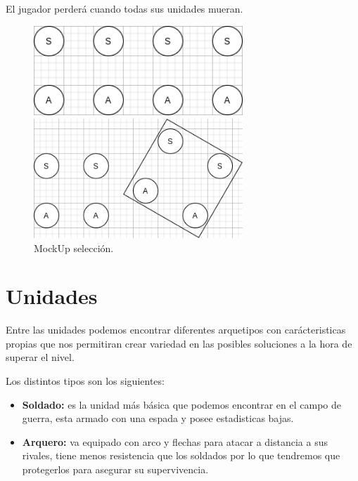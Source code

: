 El jugador perderá cuando todas sus unidades mueran.

\begin{figure}[ht]
\centering
\begin{minipage}[c]{0.45\linewidth}
	\hspace{1cm}
	\includegraphics[width=0.7\textwidth]{imagenes/gdd/non-selection.png}
\end{minipage}
\begin{minipage}[c]{0.45\linewidth}
	\includegraphics[width=0.7\textwidth]{imagenes/gdd/selection.png}
\end{minipage}	
\caption{MockUp selección.}
\label{fig:unit-selec}
\end{figure}

\section{Unidades}
Entre las unidades podemos encontrar diferentes arquetipos con carácteristicas propias
que nos permitiran crear variedad en las posibles soluciones a la hora de superar el
nivel.

Los distintos tipos son los siguientes:
\begin{itemize}
	\item \textbf{Soldado:} es la unidad más básica que podemos encontrar en el campo de
							guerra, esta armado con una espada y posee estadisticas
							bajas.
	\item \textbf{Arquero:} va equipado con arco y flechas para atacar a distancia a
							sus rivales, tiene menos resistencia que los soldados por
							lo que tendremos que protegerlos para asegurar su
							supervivencia.
\end{itemize}

